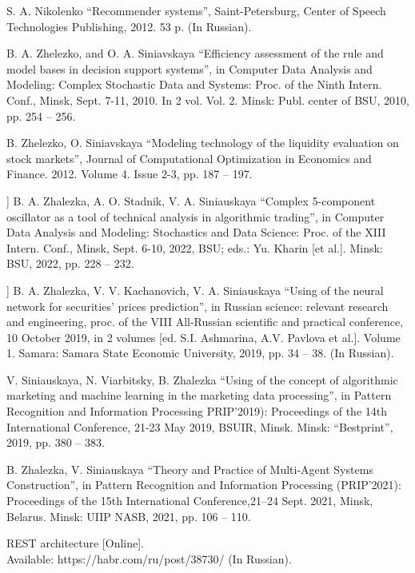\documentclass[10pt, a4paper]{article}
\begin{document}
\begin{multicols}{2}
\begin{enumerate}[label={[\arabic*]}]
   S. A. Nikolenko “Recommender systems”, Saint-Petersburg, Center of
Speech Technologies Publishing, 2012. 53 p. (In Russian).

    B. A. Zhelezko, and O. A. Siniavskaya “Efficiency assessment of the rule and
model bases in decision support systems”, in Computer Data Analysis and
Modeling: Complex Stochastic Data and Systems: Proc. of the Ninth Intern.
Conf., Minsk, Sept. 7-11, 2010. In 2 vol. Vol. 2. Minsk: Publ. center of BSU,
2010, pp. 254 – 256.

     B. Zhelezko, O. Siniavskaya “Modeling technology of the liquidity evaluation
on stock markets”, Journal of Computational Optimization in Economics and
Finance. 2012. Volume 4. Issue 2-3, pp. 187 – 197.

   ] B. A. Zhalezka, A. O. Stadnik, V. A. Siniauskaya “Complex 5-component
oscillator as a tool of technical analysis in algorithmic trading”, in Computer
Data Analysis and Modeling: Stochastics and Data Science: Proc. of the XIII
Intern. Conf., Minsk, Sept. 6-10, 2022, BSU; eds.: Yu. Kharin [et al.]. Minsk:
BSU, 2022, pp. 228 – 232.

   ] B. A. Zhalezka, V. V. Kachanovich, V. A. Siniauskaya “Using of the neural
network for securities’ prices prediction”, in Russian science: relevant
research and engineering, proc. of the VIII All-Russian scientific and
practical conference, 10 October 2019, in 2 volumes [ed. S.I. Ashmarina,
A.V. Pavlova et al.]. Volume 1. Samara: Samara State Economic University,
2019, pp. 34 – 38. (In Russian).

   V. Siniauskaya, N. Viarbitsky, B. Zhalezka “Using of the concept of
algorithmic marketing and machine learning in the marketing data
processing”, in Pattern Recognition and Information Processing PRIP’2019):
Proceedings of the 14th International Conference, 21-23 May 2019, BSUIR,
Minsk. Minsk: “Bestprint”, 2019, pp. 380 – 383.

    B. Zhalezka, V. Siniauskaya “Theory and Practice of Multi-Agent
Systems Construction”, in Pattern Recognition and Information Processing
(PRIP’2021): Proceedings of the 15th International Conference,21–24 Sept.
2021, Minsk, Belarus. Minsk: UIIP NASB, 2021, pp. 106 – 110.

   REST architecture [Online].\\ Available: https://habr.com/ru/post/38730/ (In
Russian).


\end{enumerate}
\end{multicols}
\end{document}
